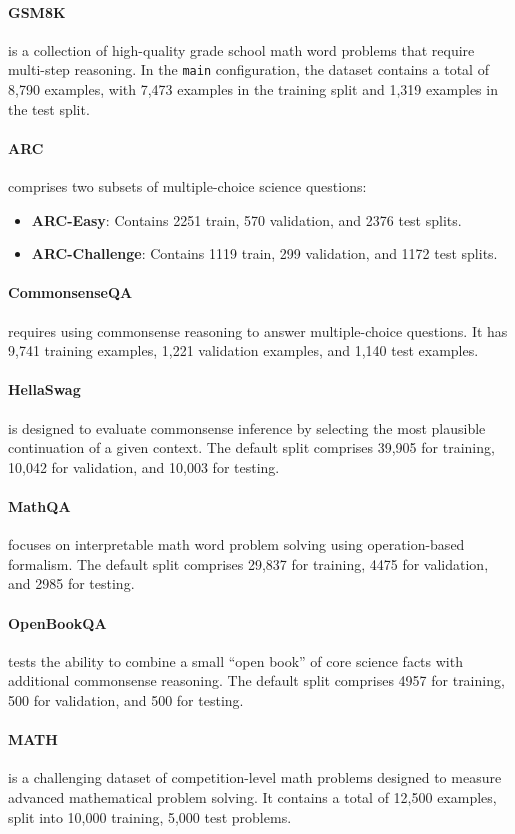 \paragraph{GSM8K} \cite{cobbe2021trainingverifierssolvemath} is a collection of high-quality grade school math word problems that require multi-step reasoning. In the \texttt{main} configuration, the dataset contains a total of 8,790 examples, with 7,473 examples in the training split and 1,319 examples in the test split. 

\paragraph{ARC} \cite{clark2018thinksolvedquestionanswering} comprises two subsets of multiple-choice science questions:
\begin{itemize}
    \item \textbf{ARC-Easy}: Contains 2251 train, 570 validation, and 2376 test splits. 
    \item \textbf{ARC-Challenge}: Contains 1119 train, 299 validation, and 1172 test splits. 
\end{itemize}

\paragraph{CommonsenseQA} \cite{talmor-etal-2019-commonsenseqa} requires using commonsense reasoning to answer multiple-choice questions. It has 9,741 training examples, 1,221 validation examples, and 1,140 test examples.

\paragraph{HellaSwag} \cite{zellers2019hellaswag} is designed to evaluate commonsense inference by selecting the most plausible continuation of a given context. The default split comprises 39,905 for training, 10,042 for validation, and 10,003 for testing.

\paragraph{MathQA} \cite{amini2019mathqa} focuses on interpretable math word problem solving using operation-based formalism. The default split comprises 29,837 for training, 4475 for validation, and 2985 for testing.

\paragraph{OpenBookQA} \cite{mihaylov2018suitarmorconductelectricity} tests the ability to combine a small “open book” of core science facts with additional commonsense reasoning. The default split comprises 4957 for training, 500 for validation, and 500 for testing.

\paragraph{MATH} \cite{hendrycksmath2021} is a challenging dataset of competition-level math problems designed to measure advanced mathematical problem solving. It contains a total of 12,500 examples, split into 10,000 training, 5,000 test problems.




